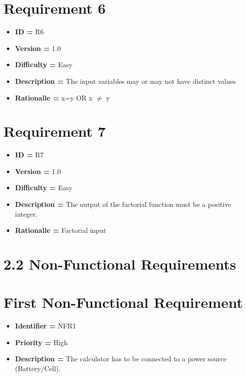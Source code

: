 \documentclass{article}
\begin{document}
\begin{itemize}[noitemsep]
    \section*{Requirement 6}
    \begin{itemize}[noitemsep]
            \item \textbf{ID = } R6
            \item\textbf{Version = } 1.0
            \item\textbf{Difficulty = } Easy
            \item\textbf{Description = } The input variables may or may not have distinct values
            \item\textbf{Rationalle = } x=y OR x $\neq$ y
        \end{itemize}
    
    \section*{Requirement 7}
    \begin{itemize}[noitemsep]
            \item \textbf{ID = } R7
            \item\textbf{Version = } 1.0
            \item\textbf{Difficulty = } Easy
            \item\textbf{Description = } The output of the factorial function must be a positive integer.
            \item\textbf{Rationalle = } Factorial input
        \end{itemize}

\Large\section*{2.2 Non-Functional Requirements}
        \section*{First Non-Functional Requirement}
        \begin{itemize}
            \item \textbf{Identifier = } NFR1
            \item\textbf{Priority = } High
            \item\textbf{Description = } The calculator has to be connected to a power source (Battery/Cell).
        \end{itemize}


\end{itemize}
\end{document}
